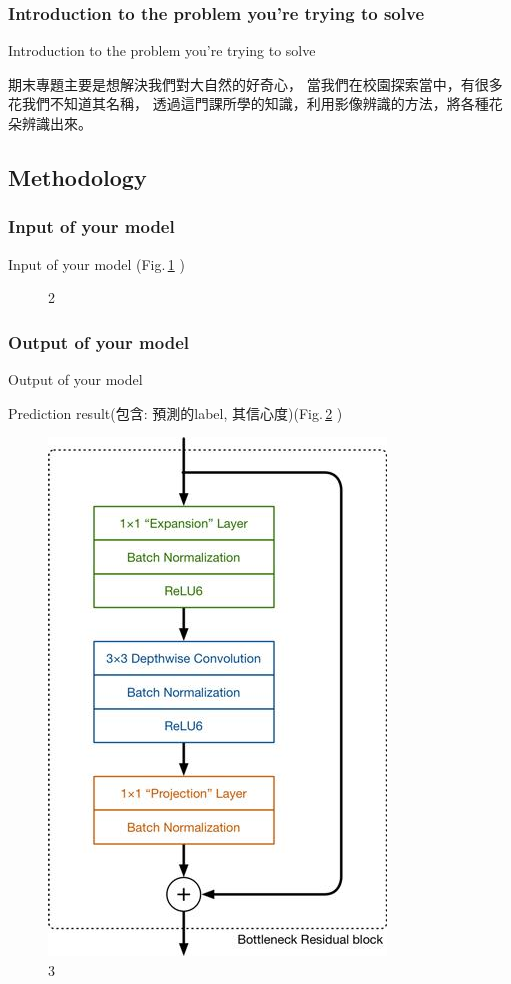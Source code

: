 \documentclass{beamer}
\begin{document}
\subsubsection{Introduction to the problem you're trying to solve \medskip}
\begin{frame}{Introduction to the problem you're trying to solve}
  \begin{CJK}{UTF8}{bkai}
  \linespread{1.5}\selectfont
	\qquad 期末專題主要是想解決我們對大自然的好奇心，
	當我們在校園探索當中，有很多花我們不知道其名稱，
	透過這門課所學的知識，利用影像辨識的方法，將各種花朵辨識出來。
  \end{CJK}
\end{frame}

\subsection{Methodology}
\subsubsection{ Input of your model }
\begin{frame}{Input of your model }
  (Fig.\,\ref{fig:2} )
    \begin{figure}
    \caption{2}
    \label{fig:2}
  \end{figure}
\end{frame}

\subsubsection{Output of your model }
\begin{frame}{Output of your model }
  \begin{CJK}{UTF8}{bkai}
	Prediction result(包含: 預測的label, 其信心度)(Fig.\,\ref{fig:3} )
    \begin{figure}
      \includegraphics[width=0.3\linewidth]{layer.jpg}
      \caption{3}
      \label{fig:3}
    \end{figure}
   \end{CJK}
\end{frame}
\end{document}
